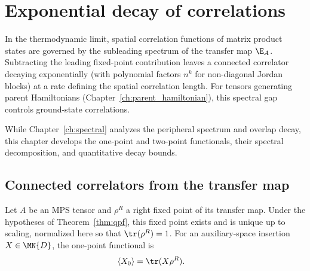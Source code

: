 \chapter{Exponential decay of correlations}\label{ch:correlations}

In the thermodynamic limit, spatial correlation functions of matrix product
states are governed by the subleading spectrum of the transfer map $\E_A$.
Subtracting the leading fixed-point contribution leaves a connected correlator
decaying exponentially (with polynomial factors $n^k$ for non-diagonal Jordan
blocks) at a rate defining the spatial correlation length. For tensors
generating parent Hamiltonians (Chapter~\ref{ch:parent_hamiltonian}), this
spectral gap controls ground-state correlations.

While Chapter~\ref{ch:spectral} analyzes the peripheral spectrum and overlap
decay, this chapter develops the one-point and two-point functionals, their
spectral decomposition, and quantitative decay bounds.

\section{Connected correlators from the transfer map}

\begin{definition}\label{def:one_point_expectation}
    \leanok
    Let $A$ be an MPS tensor and $\rho^R$ a right fixed point of its transfer map.
    Under the hypotheses of Theorem~\ref{thm:qpf}, this fixed point exists
    and is unique up to scaling, normalized here so that $\tr(\rho^R)=1$.
    For an auxiliary-space insertion $X\in\MN{D}$, the one-point functional is
    \begin{align}
        \langle X_0 \rangle & = \tr(X\rho^R). \notag
    \end{align}
\end{definition}

